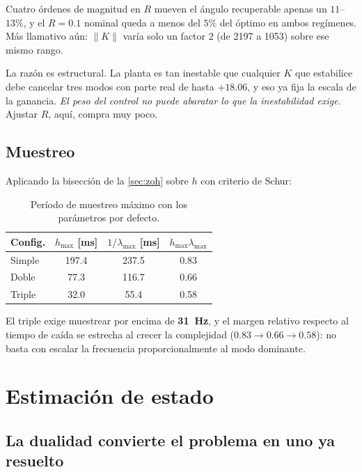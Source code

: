 \documentclass[11pt,letterpaper]{article}
\theoremstyle{definition}
\theoremstyle{plain}
\theoremstyle{remark}
\begin{document}
Cuatro órdenes de magnitud en $R$ mueven el ángulo recuperable apenas un
$11$--$13\%$, y el $R=0.1$ nominal queda a menos del $5\%$ del óptimo en ambos
regímenes. Más llamativo aún: $\|K\|$ varía solo un factor $2$ (de 2197 a 1053)
sobre ese mismo rango.

La razón es estructural. La planta es tan inestable que cualquier $K$ que
estabilice debe cancelar tres modos con parte real de hasta $+18.06$, y eso ya
fija la escala de la ganancia. \emph{El peso del control no puede abaratar lo
que la inestabilidad exige.} Ajustar $R$, aquí, compra muy poco.

\subsection{Muestreo}

Aplicando la bisección de la \cref{sec:zoh} sobre $h$ con criterio de Schur:

\begin{table}[htbp]
  \centering\small
  \caption{Período de muestreo máximo con los parámetros por defecto.}
  \label{tab:muestreo}
  \begin{tabular}{@{}lccc@{}}
    \toprule
    \textbf{Config.} & $h_{\max}$ [ms] & $1/\lambda_{\max}$ [ms] & $h_{\max}\lambda_{\max}$\\
    \midrule
    Simple & 197.4 & 237.5 & 0.83\\
    Doble  & 77.3  & 116.7 & 0.66\\
    Triple & 32.0  & 55.4  & 0.58\\
    \bottomrule
  \end{tabular}
\end{table}

El triple exige muestrear por encima de \textbf{31~Hz}, y el margen relativo
respecto al tiempo de caída se estrecha al crecer la complejidad
($0.83\to0.66\to0.58$): no basta con escalar la frecuencia proporcionalmente al
modo dominante.

\section{Estimación de estado}
\label{sec:observador}

\subsection{La dualidad convierte el problema en uno ya resuelto}
\end{document}
